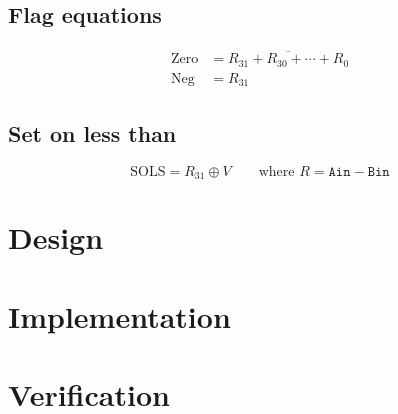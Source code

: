 \subsection*{Flag equations}

\begin{align*}
\text{Zero} &= \overline{R_{31} + R_{30} + \cdots + R_{0}} \\
\text{Neg}  &= R_{31}
\end{align*}


\subsection*{Set on less than}

\[
\text{SOLS} = R_{31} \oplus V \qquad \text{where } R = \texttt{Ain} - \texttt{Bin}
\]


\section{Design}

\section{Implementation}


\section{Verification}
%

